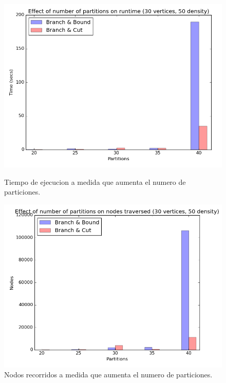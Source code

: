 \begin{figure}[h]
  \centering
  \begin{minipage}[b]{0.49\textwidth}
    \includegraphics[width=\textwidth]{img/3-partitions_v30_d50_i1_co0_l40_t1_b0.png}
    \caption{Tiempo de ejecucion a medida que aumenta el numero de particiones.}
  \end{minipage}
  \hfill
  \begin{minipage}[b]{0.49\textwidth}
    \includegraphics[width=\textwidth]{img/3-partitions_v30_d50_i1_co0_l40_t1_b0_nodes.png}
    \caption{Nodos recorridos a medida que aumenta el numero de particiones.}
  \end{minipage}
\end{figure}

